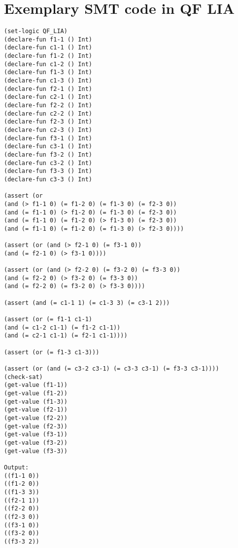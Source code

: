 \chapter{Exemplary SMT code in QF LIA}
\begin{lstlisting}
(set-logic QF_LIA)
(declare-fun f1-1 () Int)
(declare-fun c1-1 () Int)
(declare-fun f1-2 () Int)
(declare-fun c1-2 () Int)
(declare-fun f1-3 () Int)
(declare-fun c1-3 () Int)
(declare-fun f2-1 () Int)
(declare-fun c2-1 () Int)
(declare-fun f2-2 () Int)
(declare-fun c2-2 () Int)
(declare-fun f2-3 () Int)
(declare-fun c2-3 () Int)
(declare-fun f3-1 () Int)
(declare-fun c3-1 () Int)
(declare-fun f3-2 () Int)
(declare-fun c3-2 () Int)
(declare-fun f3-3 () Int)
(declare-fun c3-3 () Int)

(assert (or 
(and (> f1-1 0) (= f1-2 0) (= f1-3 0) (= f2-3 0)) 
(and (= f1-1 0) (> f1-2 0) (= f1-3 0) (= f2-3 0)) 
(and (= f1-1 0) (= f1-2 0) (> f1-3 0) (= f2-3 0)) 
(and (= f1-1 0) (= f1-2 0) (= f1-3 0) (> f2-3 0))))

(assert (or (and (> f2-1 0) (= f3-1 0)) 
(and (= f2-1 0) (> f3-1 0))))

(assert (or (and (> f2-2 0) (= f3-2 0) (= f3-3 0)) 
(and (= f2-2 0) (> f3-2 0) (= f3-3 0)) 
(and (= f2-2 0) (= f3-2 0) (> f3-3 0))))

(assert (and (= c1-1 1) (= c1-3 3) (= c3-1 2)))

(assert (or (= f1-1 c1-1) 
(and (= c1-2 c1-1) (= f1-2 c1-1)) 
(and (= c2-1 c1-1) (= f2-1 c1-1))))

(assert (or (= f1-3 c1-3)))

(assert (or (and (= c3-2 c3-1) (= c3-3 c3-1) (= f3-3 c3-1))))
(check-sat)
(get-value (f1-1))
(get-value (f1-2))
(get-value (f1-3))
(get-value (f2-1))
(get-value (f2-2))
(get-value (f2-3))
(get-value (f3-1))
(get-value (f3-2))
(get-value (f3-3))

Output:
((f1-1 0))
((f1-2 0))
((f1-3 3))
((f2-1 1))
((f2-2 0))
((f2-3 0))
((f3-1 0))
((f3-2 0))
((f3-3 2))
\end{lstlisting}

